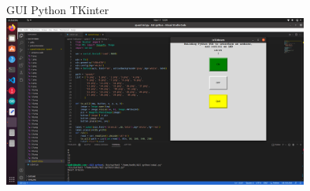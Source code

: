 \documentclass[10pt,xcolor={dvipsnames}]{beamer}
\begin{document}
\begin{frame}{GUI Python TKinter}
	\centering
	\includegraphics[width=10cm]{Gambar Lain/guitkinter.png}
\end{frame}





\end{document}
